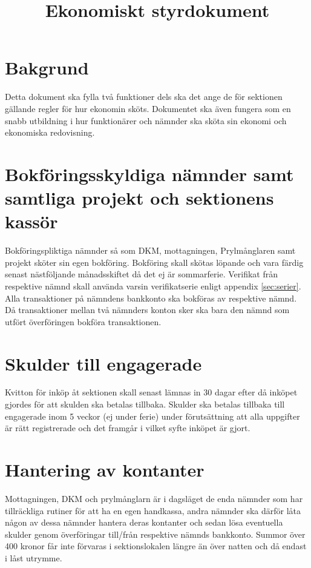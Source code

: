\documentclass{dgovdoc}
\title{Ekonomiskt styrdokument}
\begin{document}
\maketitle

\section{Bakgrund}

Detta dokument ska fylla två funktioner dels ska det ange de för sektionen
gällande regler för hur ekonomin sköts. Dokumentet ska även fungera som en
snabb utbildning i hur funktionärer och nämnder ska sköta sin ekonomi och
ekonomiska redovisning.

\section{Bokföringsskyldiga nämnder samt samtliga projekt och sektionens kassör}

Bokföringspliktiga nämnder så som DKM, mottagningen, Prylmånglaren samt projekt
sköter sin egen bokföring. Bokföring skall skötas löpande och vara färdig
senast nästföljande månadsskiftet då det ej är sommarferie. Verifikat från
respektive nämnd skall använda varsin verifikatserie enligt appendix
\ref{sec:serier}. Alla transaktioner på nämndens bankkonto ska bokföras av
respektive nämnd. Då transaktioner mellan två nämnders konton sker ska bara den
nämnd som utfört överföringen bokföra transaktionen.

\section{Skulder till engagerade}

Kvitton för inköp åt sektionen skall senast lämnas in 30 dagar efter då inköpet
gjordes för att skulden ska betalas tillbaka. Skulder ska betalas tillbaka till
engagerade inom 5 veckor (ej under ferie) under förutsättning att alla
uppgifter är rätt registrerade och det framgår i vilket syfte inköpet är gjort.

\section{Hantering av kontanter}

Mottagningen, DKM och prylmånglarn är i dagsläget de enda nämnder som har
tillräckliga rutiner för att ha en egen handkassa, andra nämnder ska därför
låta någon av dessa nämnder hantera deras kontanter och sedan lösa eventuella
skulder genom överföringar till/från respektive nämnds bankkonto. Summor över
400 kronor får inte förvaras i sektionslokalen längre än över natten och då
endast i låst utrymme.
\end{document}
